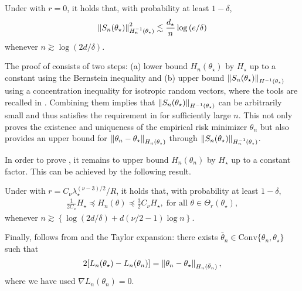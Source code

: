 \begin{proposition}\label{prop:score}
    Under  with $r = 0$, it holds that, with probability at least $1 - \delta$,
    \begin{align*}
        \left\lVert S_n(\theta_\star) \right\rVert_{H_n^{-1}(\theta_\star)}^2 \lesssim \frac{d_\star}n \log{(e/\delta)}
    \end{align*}
    whenever $n \gtrsim \log{(2d/\delta)}$.
\end{proposition}

The proof of  consists of two steps: (a) lower bound $H_n(\theta_\star)$ by $H_\star$ up to a constant using the Bernstein inequality and (b) upper bound $\left\lVert S_n(\theta_\star) \right\rVert_{H^{-1}(\theta_\star)}$ using a concentration inequality for isotropic random vectors, where the tools are recalled in .
Combining them implies that $\left\lVert S_n(\theta_\star) \right\rVert_{H^{-1}(\theta_\star)}$ can be arbitrarily small and thus satisfies the requirement in  for sufficiently large $n$.
This not only proves the existence and uniqueness of the empirical risk minimizer $\theta_n$ but also provides an upper bound for $\left\lVert \theta_n - \theta_\star \right\rVert_{H_n(\theta_\star)}$ through $\left\lVert S_n(\theta_\star) \right\rVert_{H_n^{-1}(\theta_\star)}$.

In order to prove , it remains to upper bound $H_n(\theta_n)$ by $H_\star$ up to a constant factor.
This can be achieved by the following result.
\begin{proposition}\label{prop:emp_hess_est}
    Under  with $r = C_\nu \lambda_\star^{(\nu-3)/2} / R$, it holds that, with probability at least $1 - \delta$,
    \begin{align*}
        \frac1{2C_\nu} H_\star \preceq H_n(\theta) \preceq \frac32 C_\nu H_\star, \;\mbox{for all } \theta \in \Theta_{r}(\theta_\star),
    \end{align*}
    whenever $n \gtrsim \left\{ \log{(2d/\delta)} + d (\nu/2-1) \log{n}\right\}$.
\end{proposition}

Finally,  follows from  and the Taylor expansion: there exists $\bar \theta_n \in \mbox{Conv}\{\theta_n, \theta_\star\}$ such that
\begin{align*}
    2[L_n(\theta_\star) - L_n(\theta_n)] = \left\lVert \theta_n - \theta_\star \right\rVert_{H_n(\bar \theta_n)},
\end{align*}
where we have used $\nabla L_n(\theta_n) = 0$.

